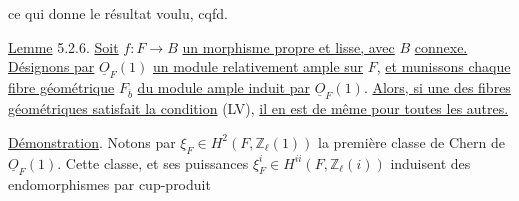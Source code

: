 \begin{center}
\end{center}
ce qui donne le résultat voulu, cqfd.



\underline{Lemme} 5.2.6. \underline{Soit} $f : F \longrightarrow B$ \underline{un morphisme propre et lisse, avec} $B$ \underline{connexe. Désignons par} $\underline{O}_F(1)$ \underline{un module relativement ample sur} $F$, \underline{et munissons chaque fibre géométrique} $F_{\bar{b}}$ \underline{du module ample induit par} $\underline{O}_F(1)$. \underline{Alors, si une des fibres géométriques satisfait la condition} (LV), \underline{il en est de même pour toutes les autres.}

\underline{Démonstration}. Notons par $\xi_F \in H^2(F,\mathbb{Z}_\ell(1))$ la première classe de Chern de $\underline{O}_F(1)$. Cette classe, et ses puissances $\xi_F^i \in H^{ii}(F,\mathbb{Z}_\ell(i))$ induisent des endomorphismes par cup-produit

